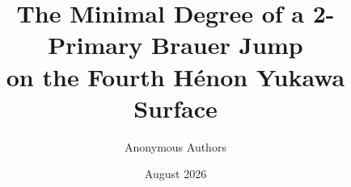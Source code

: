 \documentclass[11pt]{article}
\title{The Minimal Degree of a 2-Primary Brauer Jump\\
on the Fourth H\'enon Yukawa Surface}
\author{Anonymous Authors}
\date{August 2026}
\theoremstyle{definition}
\theoremstyle{remark}
\begin{document}
\maketitle












\appendix






\begingroup
\raggedright


\endgroup
\end{document}
